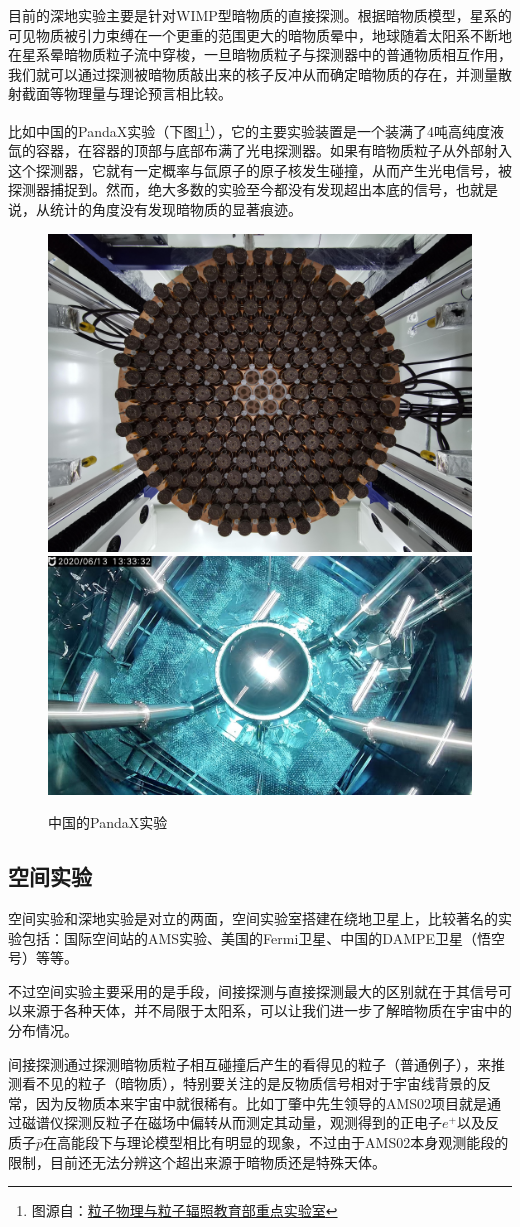 \documentclass{ctexart}
\newcommand{\dotemph}[1]{\CJKunderdot{#1}}
\begin{document}
	目前的深地实验主要是针对WIMP型暗物质的直接探测。根据暗物质模型，星系的可见物质被引力束缚在一个更重的范围更大的暗物质晕中，地球随着太阳系不断地在星系晕暗物质粒子流中穿梭，一旦暗物质粒子与探测器中的普通物质相互作用，我们就可以通过探测被暗物质敲出来的核子反冲从而确定暗物质的存在，并测量散射截面等物理量与理论预言相比较。
	
	比如中国的PandaX实验（下图\ref{fig:8}\footnote{图源自：\href{http://www.pppi.sdu.edu.cn/info/1041/2937.htm}{粒子物理与粒子辐照教育部重点实验室}}），它的主要实验装置是一个装满了4吨高纯度液氙的容器，在容器的顶部与底部布满了光电探测器。如果有暗物质粒子从外部射入这个探测器，它就有一定概率与氙原子的原子核发生碰撞，从而产生光电信号，被探测器捕捉到。然而，绝大多数的实验至今都没有发现超出本底的信号，也就是说，从统计的角度没有发现暗物质的显著痕迹。
	\begin{figure}[h]
		\centering
		\includegraphics[width=.45\linewidth]{figs/fig8-1.jpg}
		\hspace{.05\linewidth}
		\includegraphics[width=.45\linewidth]{figs/fig8-2.jpg}
		\label{fig:8}
		\caption{中国的PandaX实验}
	\end{figure}
	\subsection{空间实验}
	空间实验和深地实验是对立的两面，空间实验室搭建在绕地卫星上，比较著名的实验包括：国际空间站的AMS实验、美国的Fermi卫星、中国的DAMPE卫星（悟空号）等等。
	
	不过空间实验主要采用的是\dotemph{间接探测}手段，间接探测与直接探测最大的区别就在于其信号可以来源于各种天体，并不局限于太阳系，可以让我们进一步了解暗物质在宇宙中的分布情况。
	
	间接探测通过探测暗物质粒子相互碰撞后产生的看得见的粒子（普通例子），来推测看不见的粒子（暗物质），特别要关注的是反物质信号相对于宇宙线背景的反常，因为反物质本来宇宙中就很稀有。比如丁肇中先生领导的AMS02项目就是通过磁谱仪探测反粒子在磁场中偏转从而测定其动量，观测得到的正电子$e^+$以及反质子$\bar{p}$在高能段下与理论模型相比有明显的\dotemph{超出}现象，不过由于AMS02本身观测能段的限制，目前还无法分辨这个超出来源于暗物质还是特殊天体。
	
\end{document}
